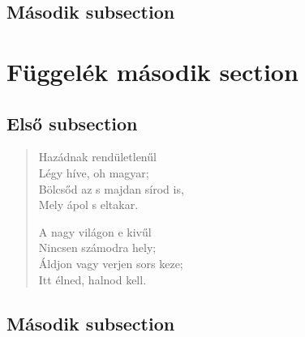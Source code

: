 \documentclass[twocolumn, twoside]{article}
\begin{document}
\subsection{Második subsection}
\quotation{\hulipsum[2]}

\section{Függelék második section}
\subsection{Első subsection}
\begin{verse}
Hazádnak rendületlenűl\\
Légy híve, oh magyar;\\
Bölcsőd az s majdan sírod is,\\
Mely ápol s eltakar.\newline

A nagy világon e kivűl\\
Nincsen számodra hely;\\
Áldjon vagy verjen sors keze;\\
Itt élned, halnod kell.
\end{verse}
\subsection{Második subsection}
\end{document}
